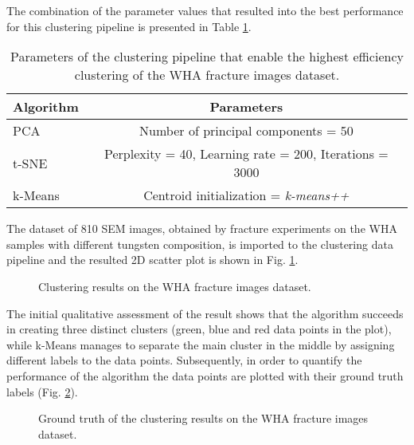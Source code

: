 \documentclass[authoryear,preprint,review,12pt, singleside]{elsarticle}
\begin{document}
The combination of the parameter values that resulted into the best performance for this clustering pipeline is presented in Table \ref{table:clust}.  


\begin{table}[h]
	\centering
	\begin{tabular}[t]{ l  c } 
		\toprule
		Algorithm \hspace{1ex}  &  Parameters \\ \toprule
		PCA       \hspace{1ex}  &  Number of principal components = 50 \\
		t-SNE     \hspace{1ex}  &  Perplexity = 40, Learning rate = 200, Iterations = 3000 \\
		k-Means   \hspace{1ex}  &  Centroid initialization = \textit{k-means++} \\
		\bottomrule
	\end{tabular}
	\caption{Parameters of the clustering pipeline that enable the highest efficiency clustering of the WHA fracture images dataset.}
	\label{table:clust} 
\end{table} 

The dataset of 810 SEM images, obtained by fracture experiments on the WHA samples with different tungsten composition, is imported to the clustering data pipeline and the resulted 2D scatter plot is shown in Fig. \ref{fig:cluster_result}.


\begin{figure}[!h]
	\centering
	\caption{Clustering results on the WHA fracture images dataset.}
	\label{fig:cluster_result}
\end{figure}
  
The initial qualitative assessment of the result shows that the algorithm succeeds in creating three distinct clusters (green, blue and red data points in the plot), while k-Means manages to separate the main cluster in the middle by assigning different labels to the data points. Subsequently, in order to quantify the performance of the algorithm the data points are plotted with their ground truth labels (Fig. \ref{fig:cluster_result_gt}). 

\begin{figure}[!h]
	\centering
	\caption{Ground truth of the clustering results on the WHA fracture images dataset.}
	\label{fig:cluster_result_gt}
\end{figure}
\end{document}

